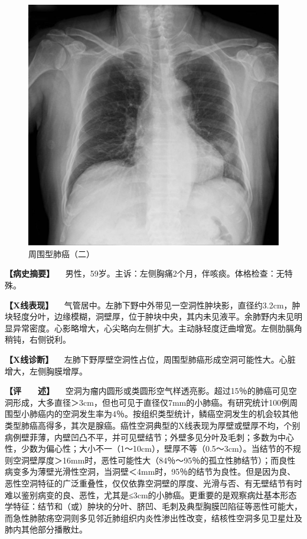 \begin{figure}[!htbp]
 \centering
 \includegraphics{./images/Image00167.jpg}
 \captionsetup{justification=centering}
 \caption{周围型肺癌（二）}
 \label{fig3-8-5}
  \end{figure} 

\textbf{【病史摘要】}
　男性，59岁。主诉：左侧胸痛2个月，伴咳痰。体格检查：无特殊。

\textbf{【X线表现】}
　气管居中。左肺下野中外带见一空洞性肿块影，直径约3.2cm，肿块轻度分叶，边缘模糊，洞壁厚，位于肿块中央，其内未见液平。余肺野内未见明显异常密度。心影略增大，心尖略向左侧扩大。主动脉轻度迂曲增宽。左侧肋膈角稍钝，右侧锐利。

\textbf{【X线诊断】}
　左肺下野厚壁空洞性占位，周围型肺癌形成空洞可能性大。心脏增大，左侧胸膜增厚。

\textbf{【评　　述】}
　空洞为瘤内圆形或类圆形空气样透亮影。超过15％的肺癌可见空洞形成，大多直径＞3cm，但也可见于直径仅7mm的小肺癌。有研究统计100例周围型小肺癌内的空洞发生率为4％。按组织类型统计，鳞癌空洞发生的机会较其他类型肺癌高得多，其次是腺癌。癌性空洞典型的X线表现为厚壁或壁厚不均，个别病例壁菲薄，内壁凹凸不平，并可见壁结节；外壁多见分叶及毛刺；多数为中心性，少数为偏心性；大小不一（1～10cm），壁厚不等（0.5～3cm）。当结节的不规则空洞壁厚度＞16mm时，恶性可能性大（84％～95％的孤立性肺结节）；而良性病变多为薄壁光滑性空洞，当洞壁＜4mm时，95％的结节为良性。但是因为良、恶性空洞特征的广泛重叠性，仅仅依靠空洞壁的厚度、光滑与否、有无壁结节有时难以鉴别病变的良、恶性，尤其是≤3cm的小肺癌。更重要的是观察病灶基本形态学特征：结节和（或）肿块的分叶、脐凹、毛刺及典型胸膜凹陷征等恶性可能大，而急性肺脓疡空洞则多见邻近肺组织内炎性渗出性改变，结核性空洞多见卫星灶及肺内其他部分播散灶。


